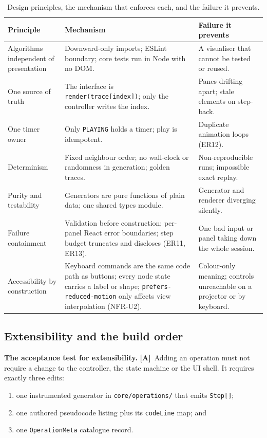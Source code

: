 \documentclass[11pt,a4paper]{article}
\newcommand{\A}{\textcolor{asmc}{\textbf{[A]}}}     %
\newcommand{\ct}[1]{\texttt{#1}}
\begin{document}
\begin{table}[H]
\centering
\small
\setlength{\tabcolsep}{4pt}
\begin{tabular}{@{}L{4.1cm}L{5.6cm}L{5.5cm}@{}}
\toprule
\textbf{Principle} & \textbf{Mechanism} & \textbf{Failure it prevents} \\
\midrule
Algorithms independent of presentation & Downward-only imports; ESLint boundary; core tests run in
Node with no DOM. & A visualiser that cannot be tested or reused. \\
One source of truth & The interface is \ct{render(trace[index])}; only the controller writes the
index. & Panes drifting apart; stale elements on step-back. \\
One timer owner & Only \ct{PLAYING} holds a timer; play is idempotent. & Duplicate animation loops
(ER12). \\
Determinism & Fixed neighbour order; no wall-clock or randomness in generation; golden traces. &
Non-reproducible runs; impossible exact replay. \\
Purity and testability & Generators are pure functions of plain data; one shared types module. &
Generator and renderer diverging silently. \\
Failure containment & Validation before construction; per-panel React error boundaries; step budget
truncates and discloses (ER11, ER13). & One bad input or panel taking down the whole session. \\
Accessibility by construction & Keyboard commands are the same code path as buttons; every node
state carries a label or shape; \ct{prefers-reduced-motion} only affects view interpolation
(NFR-U2). & Colour-only meaning; controls unreachable on a projector or by keyboard. \\
\bottomrule
\end{tabular}
\caption{Design principles, the mechanism that enforces each, and the failure it prevents.}
\end{table}

\subsection{Extensibility and the build order}

\noindent\textbf{The acceptance test for extensibility.} \A\ Adding an operation must not require a
change to the controller, the state machine or the UI shell. It requires exactly three edits:

\begin{enumerate}[leftmargin=1.6em,topsep=2pt,itemsep=1pt]
  \item one instrumented generator in \ct{core/operations/} that emits \ct{Step[]};
  \item one authored pseudocode listing plus its \ct{codeLine} map; and
  \item one \ct{OperationMeta} catalogue record.
\end{enumerate}
\end{document}
